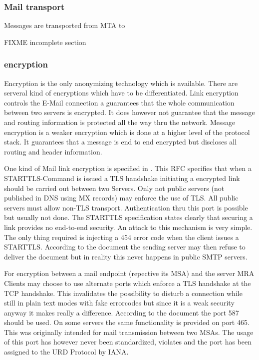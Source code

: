 \subsubsection{Mail transport}
Messages are transported from MTA to \cite{RFC1870}
\par FIXME incomplete section

\subsubsection{encryption}
Encryption is the only anonymizing technology which is available. There are serveral kind of encryptions which have to be differentiated. Link encryption controls the E-Mail connection a guarantees that the whole communication between two servers is encrypted. It does however not guarantee that the message and routing information is protected all the way thru the network. Message encryption is a weaker encryption which is done at a higher level of the protocol stack. It guarantees that a message is end to end encrypted but discloses all routing and header information.\par

One kind of Mail link encryption is specified in \cite{RFC3207}. This RFC specifies that when a STARTTLS-Command is issued a TLS handshake initiating a encrypted link should be carried out between two Servers. Only not public servers (not published in DNS using MX records) may enforce the use of TLS. All public servers must allow non-TLS transport. Authentication thru this port is possible but usually not done. The STARTTLS specification states clearly that securing a link provides no end-to-end security. An attack to this mechanism is very simple. The only thing required is injecting a 454 error code when the client issues a STARTTLS. According to the document the sending server may then refuse to deliver the document but in reality this never happens in public SMTP servers.\par

For encryption between a mail endpoint (repective its MSA)  and the server MRA Clients may choose to use alternate ports which enforce a TLS handshake at the TCP handshake. This invalidates the possibility to disturb a connection while still in plain text modes with fake errorcodes but since it is a weak security anyway it makes really a difference. According to the \cite{RFC3207} document the port 587 should be used. On some servers the same functionality is provided on port 465. This was originally intended for mail transmission between two MSAs. The usage of this port has however never been standardized, violates \cite{RFC6409} and the port has been assigned to the URD Protocol by IANA.\par

